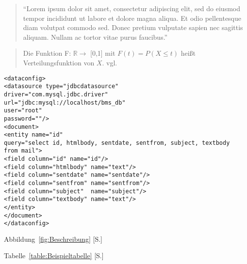 
\begin{quote}
  \singlespacing \small
  "`Lorem ipsum dolor sit amet, consectetur adipiscing elit, sed do eiusmod tempor incididunt ut labore et dolore magna aliqua. 
  Et odio pellentesque diam volutpat commodo sed. Donec pretium vulputate sapien nec sagittis aliquam. Nullam ac tortor vitae 
  purus faucibus."'~\autocite[S. 189]{KnutThea2009}
\end{quote}




\begin{quote}
  Die Funktion F: $\mathbb{R} \rightarrow$ [0,1] mit $F(t) = P (X \le t)$ heißt Verteilungsfunktion von $X$. vgl. \cite[S.55]{mf2005}
\end{quote}




\lstset{language=xml}
\begin{lstlisting}[float=!ht, frame=htrbl, caption={die datei {\normalfont \ttfamily  data-config.xml} dient als beispiel für xml quellcode}, label={lst:dataconfigxml}]
<dataconfig>
<datasource type="jdbcdatasource" 
driver="com.mysql.jdbc.driver"
url="jdbc:mysql://localhost/bms_db"
user="root" 
password=""/>
<document>
<entity name="id"
query="select id, htmlbody, sentdate, sentfrom, subject, textbody
from mail">
<field column="id" name="id"/>
<field column="htmlbody" name="text"/>
<field column="sentdate" name="sentdate"/>
<field column="sentfrom" name="sentfrom"/>
<field column="subject"  name="subject"/>
<field column="textbody" name="text"/>
</entity>
</document>
</dataconfig>
\end{lstlisting}




Abbildung~\ref{fig:Beschreibung} [S.\pageref{fig:Beschreibung}]




Tabelle~\ref{table:Beispieltabelle} [S.\pageref{table:Beispieltabelle}]




~\autocite[S.55]{mf2005}

